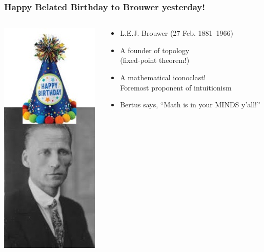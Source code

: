 \begin{frame}
  \frametitle{Happy Belated Birthday to Brouwer yesterday!}

  \begin{columns}
    \begin{column}{.4\textwidth}
      \includegraphics[height=.8\textheight]{../assets/Brouwer_hat}
    \end{column}
    \begin{column}{.6\textwidth}
      \begin{itemize}[<+->]
        \item L.E.J. Brouwer (27 Feb. 1881--1966)
        \item A founder of topology \\ (fixed-point theorem!)
        \item A mathematical iconoclast! \\ Foremost proponent of intuitionism
\item Bertus says, ``Math is in your MINDS y'all!'' 

      \end{itemize}
    \end{column}
  \end{columns}
\end{frame}



